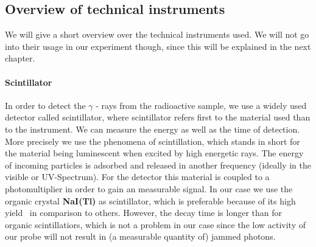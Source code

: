 \subsection{Overview of technical instruments}
We will give a short overview over the technical instruments used. We will not go into their usage
in our experiment though, since this will be explained in the next chapter.
\label{sub:overview_of_technical_instruments}
\paragraph{Scintillator}
In order to detect the $\gamma$ - rays from the radioactive sample, we use a widely used detector called
scintillator, where scintillator refers first to the material used than to the instrument. 
We can measure the energy as well
as the time of detection. More precisely we use the phenomena of scintillation, which stands in short
for the material being luminescent when excited by high energetic rays. The energy of incoming particles
is adsorbed and released in another frequency (ideally in the visible or UV-Spectrum). 
For the detector this material is coupled to a photomultiplier in order
to gain an measurable signal. In our case we use the organic crystal \textbf{NaI(Tl)} as scintillator, which
is preferable because of its high yield~\cite{ver} in comparison to others. However, the decay time is longer
than for organic scintillatiors, which is not a problem in our case since the low activity of our probe will
not result in (a measurable quantity of) jammed photons.
